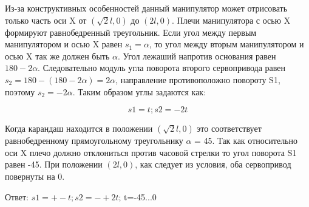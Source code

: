 \solutionSection
Из-за конструктивных особенностей данный манипулятор может отрисовать только часть оси X от $(\sqrt{2}l, 0)$ до $(2l, 0)$. Плечи манипулятора с осью X формируют равнобедренный треугольник. Если угол между первым манипулятором и осью X равен $s_1=\alpha$, то угол между вторым манипулятором и осью X так же должен быть $\alpha$. Угол лежаший напротив основания равен $180 - 2\alpha$. Следовательно модуль угла поворота второго сервопривода равен $s_2 = 180 - (180 - 2\alpha) = 2\alpha$, направление противоположно повороту S1, поэтому $s_2 = -2\alpha$. Таким образом углы задаются как:

\[ s1 = t; s2 = -2t\]

Когда карандаш находится в положении $(\sqrt{2}l, 0)$ это соответствует равнобедренному прямоугольному треугольнику $\alpha$ = 45\textdegree. Так как относительно оси X плечо должно отклониться против часовой стрелки то угол поворота S1 равен -45\textdegree. При положении $(2l, 0)$, как следует из условия, оба сервопривод повернуты на 0\textdegree. 

Ответ: $s1 = +-t; s2 = -+2t$; t=-45\textdegree...0\textdegree




